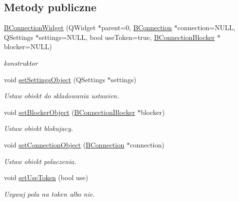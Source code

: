 \subsection*{Metody publiczne}
\begin{CompactItemize}
\item 
\hyperlink{class_b_connection_widget_f549f688fe132260b6a1333cde59dba7}{BConnectionWidget} (QWidget $\ast$parent=0, \hyperlink{class_b_connection}{BConnection} $\ast$connection=NULL, QSettings $\ast$settings=NULL, bool useToken=true, \hyperlink{class_b_connection_blocker}{BConnectionBlocker} $\ast$blocker=NULL)
\begin{CompactList}\small\item\em konstruktor \item\end{CompactList}\item 
void \hyperlink{class_b_connection_widget_45070066f5da8af537f422d8b37c7d6e}{setSettingsObject} (QSettings $\ast$settings)
\begin{CompactList}\small\item\em Ustaw obiekt do skladowania ustawien. \item\end{CompactList}\item 
void \hyperlink{class_b_connection_widget_976657d9910495a76d16b7c90d0b54fc}{setBlockerObject} (\hyperlink{class_b_connection_blocker}{BConnectionBlocker} $\ast$blocker)
\begin{CompactList}\small\item\em Ustaw obiekt blokujacy. \item\end{CompactList}\item 
void \hyperlink{class_b_connection_widget_476033357eea69f9ef4a7f4235a97556}{setConnectionObject} (\hyperlink{class_b_connection}{BConnection} $\ast$connection)
\begin{CompactList}\small\item\em Ustaw obiekt polaczenia. \item\end{CompactList}\item 
void \hyperlink{class_b_connection_widget_80d71ca868172dc623b9fa6c1ab938a6}{setUseToken} (bool use)
\begin{CompactList}\small\item\em Uzywaj pola na token albo nie. \item\end{CompactList}\end{CompactItemize}
